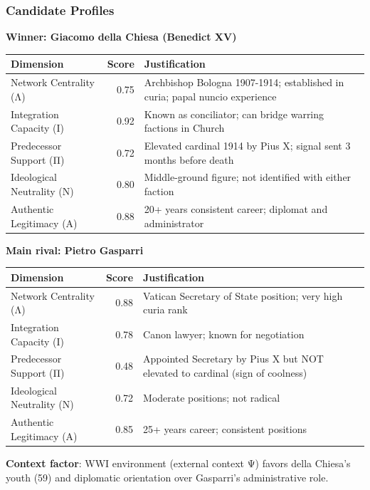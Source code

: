 \documentclass[11pt,a4paper]{article}
\begin{document}
\subsubsection{Candidate Profiles}

\textbf{Winner: Giacomo della Chiesa (Benedict XV)}

\begin{center}
\begin{tabular}{lrp{4cm}}
\toprule
\textbf{Dimension} & \textbf{Score} & \textbf{Justification} \\
\midrule
Network Centrality (Λ) & 0.75 & Archbishop Bologna 1907-1914; established in curia; papal nuncio experience \\
Integration Capacity (Ι) & 0.92 & Known as conciliator; can bridge warring factions in Church \\
Predecessor Support (Π) & 0.72 & Elevated cardinal 1914 by Pius X; signal sent 3 months before death \\
Ideological Neutrality (Ν) & 0.80 & Middle-ground figure; not identified with either faction \\
Authentic Legitimacy (Α) & 0.88 & 20+ years consistent career; diplomat and administrator \\
\bottomrule
\end{tabular}
\end{center}

\textbf{Main rival: Pietro Gasparri}

\begin{center}
\begin{tabular}{lrp{4cm}}
\toprule
\textbf{Dimension} & \textbf{Score} & \textbf{Justification} \\
\midrule
Network Centrality (Λ) & 0.88 & Vatican Secretary of State position; very high curia rank \\
Integration Capacity (Ι) & 0.78 & Canon lawyer; known for negotiation \\
Predecessor Support (Π) & 0.48 & Appointed Secretary by Pius X but NOT elevated to cardinal (sign of coolness) \\
Ideological Neutrality (Ν) & 0.72 & Moderate positions; not radical \\
Authentic Legitimacy (Α) & 0.85 & 25+ years career; consistent positions \\
\bottomrule
\end{tabular}
\end{center}

\textbf{Context factor}: WWI environment (external context Ψ) favors della Chiesa's youth (59) and diplomatic orientation over Gasparri's administrative role.
\end{document}
